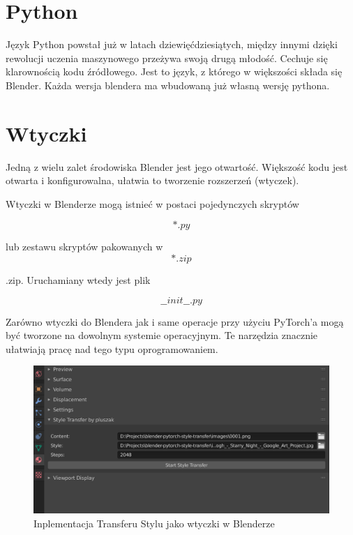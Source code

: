 \documentclass[brudnopis]{xmgr}
\begin{document}
\section{Python\label{s:dsssl}}

Język Python powstał już w latach dziewięćdziesiątych, między innymi dzięki rewolucji uczenia maszynowego przeżywa swoją drugą młodość. Cechuje się klarownością kodu źródłowego.
Jest to język, z którego w większości składa się Blender. Każda wersja blendera ma wbudowaną już własną wersję pythona. 

\section{Wtyczki\label{s:dsssl}}

Jedną z wielu zalet środowiska Blender jest jego otwartość. Większość kodu jest otwarta i konfigurowalna, ułatwia to tworzenie rozszerzeń (wtyczek).



Wtyczki w Blenderze mogą istnieć w postaci pojedynczych skryptów 

\begin{equation}
*.py
\end{equation}

lub zestawu skryptów pakowanych w 
\begin{equation}
*.zip
\end{equation}

.zip. Uruchamiany wtedy jest plik 

\begin{equation}
\_\_init\_\_.py
\end{equation}


Zarówno wtyczki do Blendera jak i same operacje przy użyciu PyTorch’a mogą być tworzone na dowolnym systemie operacyjnym. Te narzędzia znacznie ułatwiają pracę nad tego typu oprogramowaniem.

\begin{figure}[!tbh]
\centering
\includegraphics[width=.8\hsize]{fig/9}
\caption{Inplementacja Transferu Stylu jako wtyczki w Blenderze\label{RYS.9}}
\end{figure}
\end{document}
